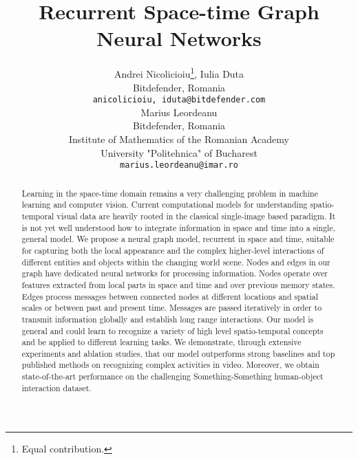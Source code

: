 \documentclass{article}
\begin{document}
\title{Recurrent Space-time Graph Neural Networks}



\makeatletter
\newcommand{\printfnsymbol}[1]{\textsuperscript{\@fnsymbol{#1}}}
\makeatother

\author{Andrei Nicolicioiu\thanks{Equal contribution.}, \hspace{1.5mm}Iulia Duta\printfnsymbol{1}
  \\
  Bitdefender, Romania\\
  \texttt{{anicolicioiu, iduta}@bitdefender.com} \\
   \And
   Marius Leordeanu \\
   Bitdefender, Romania \\
\fontsize{6pt}{7pt}Institute of Mathematics of the Romanian Academy \\
   University "Politehnica" of Bucharest \\
   \texttt{marius.leordeanu@imar.ro} \\
}

\maketitle
\begin{abstract}
 Learning in the space-time domain remains a very challenging problem in machine learning and computer vision. Current computational models for understanding spatio-temporal visual data are heavily rooted in the classical single-image based paradigm. It is not yet well understood how to integrate information in space and time into a single, general model. We propose a neural graph model, recurrent in space and time, suitable for capturing both the local appearance and the complex higher-level interactions of different entities and objects within the changing world scene. Nodes and edges in our graph have dedicated neural networks for processing information. Nodes operate over features extracted from local parts in space and time and over previous memory states. Edges process messages between connected nodes at different locations and spatial scales or between past and present time. Messages are passed iteratively in order to transmit information globally and establish long range interactions. Our model is general and could learn to recognize a variety of high level spatio-temporal concepts and be applied to different learning tasks. We demonstrate, through extensive experiments and ablation studies, that our model outperforms strong baselines and top published methods on recognizing complex activities in video. Moreover, we obtain state-of-the-art performance on the challenging Something-Something human-object interaction dataset.
\end{abstract}
\end{document}
